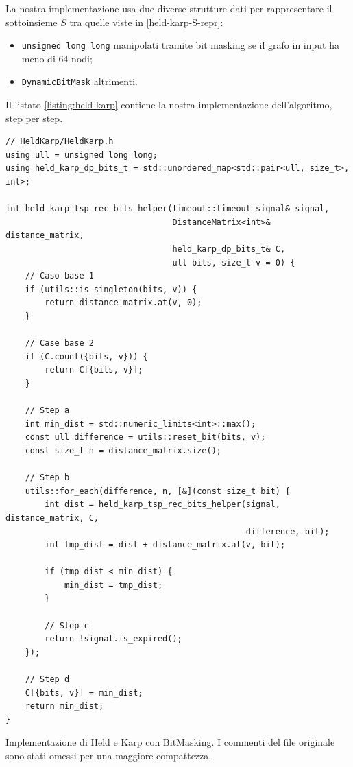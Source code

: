 \noindent La nostra implementazione usa due diverse strutture dati per rappresentare il sottoinsieme $S$ tra quelle viste in \ref{held-karp-S-repr}:

\begin{itemize}
    \item \texttt{unsigned long long} manipolati tramite bit masking se il grafo in input ha meno di 64 nodi;
    \item \texttt{DynamicBitMask} altrimenti.
\end{itemize}

\noindent Il listato \ref{listing:held-karp} contiene la nostra implementazione dell'algoritmo, step per step.

\begin{listing}[!ht]
\begin{verbatim}
// HeldKarp/HeldKarp.h
using ull = unsigned long long;
using held_karp_dp_bits_t = std::unordered_map<std::pair<ull, size_t>, int>;

int held_karp_tsp_rec_bits_helper(timeout::timeout_signal& signal,
                                  DistanceMatrix<int>& distance_matrix,
                                  held_karp_dp_bits_t& C,
                                  ull bits, size_t v = 0) {
    // Caso base 1
    if (utils::is_singleton(bits, v)) {
        return distance_matrix.at(v, 0);
    }

    // Case base 2
    if (C.count({bits, v})) {
        return C[{bits, v}];
    }

    // Step a
    int min_dist = std::numeric_limits<int>::max();
    const ull difference = utils::reset_bit(bits, v);
    const size_t n = distance_matrix.size();

    // Step b
    utils::for_each(difference, n, [&](const size_t bit) {
        int dist = held_karp_tsp_rec_bits_helper(signal, distance_matrix, C,
                                                 difference, bit);
        int tmp_dist = dist + distance_matrix.at(v, bit);

        if (tmp_dist < min_dist) {
            min_dist = tmp_dist;
        }

        // Step c
        return !signal.is_expired();
    });

    // Step d
    C[{bits, v}] = min_dist;
    return min_dist;
}

\end{verbatim}
\caption{Implementazione di Held e Karp con BitMasking. I commenti del file originale sono stati omessi per una maggiore compattezza.}
\label{listing:held-karp}
\end{listing}

